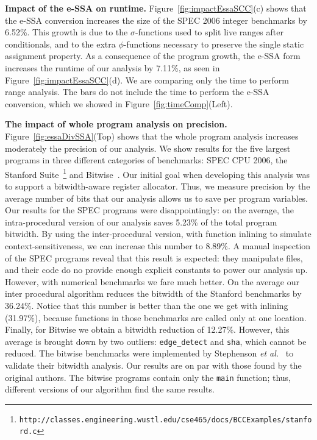\documentclass{llncs}
\begin{document}
\noindent
\textbf{Impact of the e-SSA on runtime.}
Figure~\ref{fig:impactEssaSCC}(c) shows that the e-SSA conversion increases
the size of the SPEC 2006 integer benchmarks by 6.52\%.
This growth is due to the $\sigma$-functions used to split live ranges
after conditionals, and to the extra $\phi$-functions necessary to preserve the
single static assignment property.
As a consequence of the program growth, the e-SSA form increases the runtime of
our analysis by 7.11\%, as seen in Figure~\ref{fig:impactEssaSCC}(d).
We are comparing only the time to perform range analysis.
The bars do not include the time to perform the e-SSA conversion, which we
showed in Figure~\ref{fig:timeComp}(Left).

\noindent
\textbf{The impact of whole program analysis on precision.}
Figure~\ref{fig:essaDivSSA}(Top) shows that the whole program analysis increases
moderately the precision of our analysis.
We show results for the five largest programs in three different categories of
benchmarks: SPEC CPU 2006, the Stanford Suite~\footnote{\texttt{http://classes.engineering.wustl.edu/cse465/docs/BCCExamples/stanford.c}} and
Bitwise~\cite{Stephenson00}.
Our initial goal when developing this analysis was to support a bitwidth-aware
register allocator.
Thus, we measure precision by the average number of bits that our
analysis allows us to save per program variables.
Our results for the SPEC programs were disappointingly: on the average, the
intra-procedural version of our analysis saves 5.23\% of the total program
bitwidth.
By using the inter-procedural version, with function inlining to simulate
context-sensitiveness, we can increase this number to 8.89\%.
A manual inspection of the SPEC programs reveal that this result is expected:
they manipulate files, and their code do no provide enough
explicit constants to power our analysis up.
However, with numerical benchmarks we fare much better.
On the average our inter procedural algorithm reduces the bitwidth of the
Stanford benchmarks by 36.24\%.
Notice that this number is better than the one we get with inlining (31.97\%),
because functions in those benchmarks are called only at one location.
Finally, for Bitwise we obtain a bitwidth reduction of 12.27\%.
However, this average is brought down by two outliers: \texttt{edge\_detect} and
\texttt{sha}, which cannot be reduced.
The bitwise benchmarks were implemented by Stephenson
{\em et al.}~\cite{Stephenson00} to validate their bitwidth analysis.
Our results are on par with those found by the original authors.
The bitwise programs contain only the \texttt{main} function; thus, different
versions of our algorithm find the same results.
\end{document}
